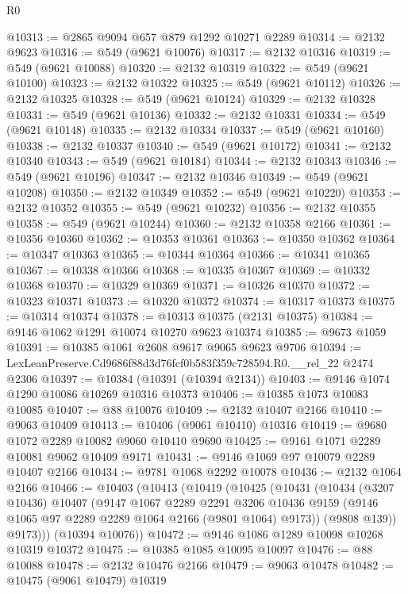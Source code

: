\begin{lexlean}{R0}
\begin{coremodule}
@10313 := @2865 @9094 @657 @879 @1292 @10271 @2289
@10314 := @2132 @9623
@10316 := @549 (@9621 @10076)
@10317 := @2132 @10316
@10319 := @549 (@9621 @10088)
@10320 := @2132 @10319
@10322 := @549 (@9621 @10100)
@10323 := @2132 @10322
@10325 := @549 (@9621 @10112)
@10326 := @2132 @10325
@10328 := @549 (@9621 @10124)
@10329 := @2132 @10328
@10331 := @549 (@9621 @10136)
@10332 := @2132 @10331
@10334 := @549 (@9621 @10148)
@10335 := @2132 @10334
@10337 := @549 (@9621 @10160)
@10338 := @2132 @10337
@10340 := @549 (@9621 @10172)
@10341 := @2132 @10340
@10343 := @549 (@9621 @10184)
@10344 := @2132 @10343
@10346 := @549 (@9621 @10196)
@10347 := @2132 @10346
@10349 := @549 (@9621 @10208)
@10350 := @2132 @10349
@10352 := @549 (@9621 @10220)
@10353 := @2132 @10352
@10355 := @549 (@9621 @10232)
@10356 := @2132 @10355
@10358 := @549 (@9621 @10244)
@10360 := @2132 @10358 @2166
@10361 := @10356 @10360
@10362 := @10353 @10361
@10363 := @10350 @10362
@10364 := @10347 @10363
@10365 := @10344 @10364
@10366 := @10341 @10365
@10367 := @10338 @10366
@10368 := @10335 @10367
@10369 := @10332 @10368
@10370 := @10329 @10369
@10371 := @10326 @10370
@10372 := @10323 @10371
@10373 := @10320 @10372
@10374 := @10317 @10373
@10375 := @10314 @10374
@10378 := @10313 @10375 (@2131 @10375)
@10384 := @9146 @1062 @1291 @10074 @10270 @9623 @10374
@10385 := @9673 @1059
@10391 := @10385 @1061 @2608 @9617 @9065 @9623 @9706
@10394 := LexLeanPreserve.Cd9686f88d3d76fcf0b583f359c728594.R0.__rel_22 @2474 @2306
@10397 := @10384 (@10391 (@10394 @2134))
@10403 := @9146 @1074 @1290 @10086 @10269 @10316 @10373
@10406 := @10385 @1073 @10083 @10085
@10407 := @88 @10076
@10409 := @2132 @10407 @2166
@10410 := @9063 @10409
@10413 := @10406 (@9061 @10410) @10316
@10419 := @9680 @1072 @2289 @10082 @9060 @10410 @9690
@10425 := @9161 @1071 @2289 @10081 @9062 @10409 @9171
@10431 := @9146 @1069 @97 @10079 @2289 @10407 @2166
@10434 := @9781 @1068 @2292 @10078
@10436 := @2132 @1064 @2166
@10466 := @10403
    (@10413
      (@10419
        (@10425
          (@10431
            (@10434
              (@3207 @10436)
              @10407
              (@9147
                @1067
                @2289
                @2291
                @3206
                @10436
                @9159
                (@9146 @1065 @97 @2289 @2289 @1064 @2166 (@9801 @1064) @9173))
              (@9808 @139))
            @9173)))
      (@10394 @10076))
@10472 := @9146 @1086 @1289 @10098 @10268 @10319 @10372
@10475 := @10385 @1085 @10095 @10097
@10476 := @88 @10088
@10478 := @2132 @10476 @2166
@10479 := @9063 @10478
@10482 := @10475 (@9061 @10479) @10319

\end{coremodule}
\end{lexlean}
